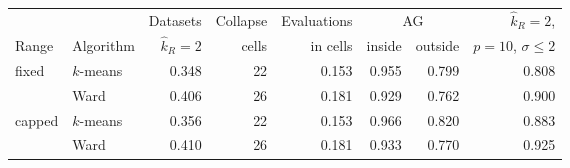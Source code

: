 \begin{tabular}{llrrrrrr}
\toprule
 & & Datasets & Collapse & Evaluations & \multicolumn{2}{c}{AG} & $\hat{k}_R=2$, \\
\cmidrule(lr){6-7}
Range & Algorithm & $\hat{k}_R=2$ & cells & in cells & inside & outside & $p{=}10$, $\sigma{\le}2$ \\
\midrule
fixed & $k$-means & 0.348 & 22 & 0.153 & 0.955 & 0.799 & 0.808 \\
 & Ward & 0.406 & 26 & 0.181 & 0.929 & 0.762 & 0.900 \\
\addlinespace
capped & $k$-means & 0.356 & 22 & 0.153 & 0.966 & 0.820 & 0.883 \\
 & Ward & 0.410 & 26 & 0.181 & 0.933 & 0.770 & 0.925 \\
\bottomrule
\end{tabular}
